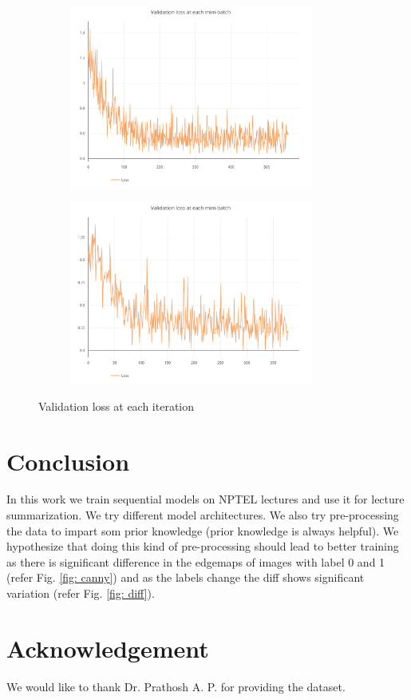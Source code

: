 \documentclass[journal]{IEEEtran}
\begin{document}
\begin{figure}[h]
	\centering

	\begin{subfigure}{0.49\textwidth}
		\centering
		\includegraphics[height = 6cm]{Images/minibatchvalloss.pdf}
	\end{subfigure}
	\hspace{1mm}
	\begin{subfigure}{0.49\textwidth}
		\centering
		\includegraphics[height = 6cm]{Images/minibatchvalloss1.pdf}
	\end{subfigure}
	
	\caption{Validation loss at each iteration}
\end{figure}

\clearpage

\section{Conclusion}
In this work we train sequential models on NPTEL lectures and use it for lecture summarization. We try different model architectures. We also try pre-processing the data to impart som prior knowledge (prior knowledge is always helpful). We hypothesize that doing this kind of pre-processing should lead to better training as there is significant difference in the  edgemaps of images with label 0 and 1 (refer Fig. \ref{fig: canny}) and as the labels change the diff shows significant variation (refer Fig. \ref{fig: diff}).

\section*{Acknowledgement}
We would like to thank Dr. Prathosh A. P. for providing the dataset.


\end{document}

